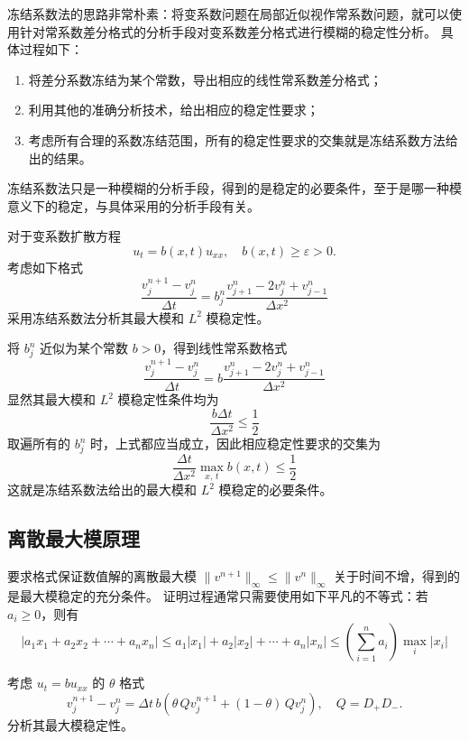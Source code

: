 冻结系数法的思路非常朴素：将变系数问题在局部近似视作常系数问题，就可以使用针对常系数差分格式的分析手段对变系数差分格式进行模糊的稳定性分析。
具体过程如下：
\begin{enumerate}
    \item 将差分系数冻结为某个常数，导出相应的线性常系数差分格式；
    \item 利用其他的准确分析技术，给出相应的稳定性要求；
    \item 考虑所有合理的系数冻结范围，所有的稳定性要求的交集就是冻结系数方法给出的结果。
\end{enumerate}
冻结系数法只是一种模糊的分析手段，得到的是稳定的必要条件，至于是哪一种模意义下的稳定，与具体采用的分析手段有关。

\begin{example}
    对于变系数扩散方程
    \[
        u_t = b(x,t) u_{xx},\quad b(x,t) \ge \varepsilon > 0.
    \]
    考虑如下格式
    \[
        \frac{v_j^{n+1} - v_j^n}{\Delta t} = b_j^n \frac{v_{j+1}^n - 2v_j^n + v_{j-1}^n}{\Delta x^2}
    \]
    采用冻结系数法分析其最大模和 $L^2$ 模稳定性。
\end{example}

\begin{solution*}
    将 $b_j^n$ 近似为某个常数 $b > 0$，得到线性常系数格式
    \[
        \frac{v_j^{n+1} - v_j^n}{\Delta t} = b \frac{v_{j+1}^n - 2v_j^n + v_{j-1}^n}{\Delta x^2}
    \]
    显然其最大模和 $L^2$ 模稳定性条件均为
    \[
        \frac{b \Delta t}{\Delta x^2} \le \frac12
    \]
    取遍所有的 $b_j^n$ 时，上式都应当成立，因此相应稳定性要求的交集为
    \[
        \frac{\Delta t}{\Delta x^2} \max_{x,\,t} b(x,t) \le \frac12
    \]
    这就是冻结系数法给出的最大模和 $L^2$ 模稳定的必要条件。
\end{solution*}


\subsection{离散最大模原理}

要求格式保证数值解的离散最大模 $\| v^{n+1}\|_\infty \le \| v^{n}\|_\infty$ 关于时间不增，得到的是最大模稳定的充分条件。
证明过程通常只需要使用如下平凡的不等式：若 $a_i \ge 0$，则有
\[
    |a_1 x_1 + a_2 x_2 + \cdots + a_n x_n | \le a_1 | x_1 | + a_2 | x_2 | + \cdots + a_n | x_n |
    \le \left(\sum_{i=1}^n a_i \right)\max_i |x_i|
\]


\begin{example}\label{eg:theta-2}
    考虑 $u_t = b u_{xx}$ 的 $\theta$ 格式
    \[
        v^{n+1}_j - v^n_j = \Delta t\,b (\theta\,Q v^{n+1}_j+(1-\theta)\, Q v^n_j),\quad Q = D_+ D_-.
    \]
    分析其最大模稳定性。
\end{example}

